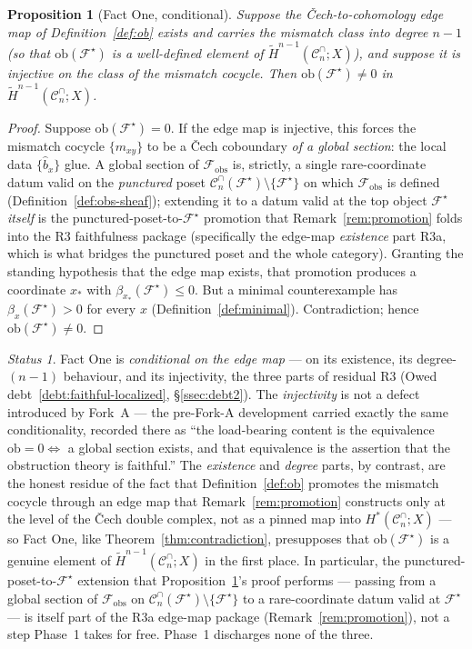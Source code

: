 \documentclass[11pt,oneside]{amsart}
\theoremstyle{plain}
\newtheorem{proposition}[theorem]{Proposition}
\theoremstyle{definition}
\theoremstyle{remark}
\theoremstyle{honeststyle}
\newtheorem{status}[theorem]{Status}
\newcommand{\F}{\mathcal{F}}
\newcommand{\Fstar}{\F^{\star}}
\newcommand{\bias}{\beta}
\newcommand{\Cn}{\mathcal{C}^{\cap}_n}
\newcommand{\ob}{\mathrm{ob}}
\newcommand{\fobs}{\mathcal{F}_{\mathrm{obs}}}
\begin{document}
\begin{proposition}[Fact One, conditional]
\label{prop:fact-one}
Suppose the \v{C}ech-to-cohomology edge map of Definition~\ref{def:ob}
exists and carries the mismatch class into degree $n-1$ (so that
$\ob(\Fstar)$ is a well-defined element of $\widetilde
H^{n-1}(\Cn;X)$), and suppose it is injective on the class of the
mismatch cocycle. Then $\ob(\Fstar)\neq0$ in $\widetilde
H^{n-1}(\Cn;X)$.
\end{proposition}

\begin{proof}
Suppose $\ob(\Fstar)=0$. If the edge map is injective, this forces the
mismatch cocycle $\{m_{xy}\}$ to be a \v{C}ech coboundary \emph{of a
global section}: the local data $\{\widehat b_x\}$ glue. A global
section of $\fobs$ is, strictly, a single rare-coordinate datum valid
on the \emph{punctured} poset $\Cn(\Fstar)\setminus\{\Fstar\}$ on
which $\fobs$ is defined (Definition~\ref{def:obs-sheaf}); extending
it to a datum valid at the top object $\Fstar$ \emph{itself} is the
punctured-poset-to-$\Fstar$ promotion that
Remark~\ref{rem:promotion} folds into the R3 faithfulness package
(specifically the edge-map \emph{existence} part R3a, which is what
bridges the punctured poset and the whole category). Granting the
standing hypothesis that the edge map exists, that promotion produces
a coordinate $x_\ast$ with $\bias_{x_\ast}(\Fstar)\le0$. But a
minimal counterexample has $\bias_x(\Fstar)>0$ for every $x$
(Definition~\ref{def:minimal}). Contradiction; hence
$\ob(\Fstar)\neq0$.
\end{proof}

\begin{status}
\label{status:fact-one}
Fact One is \emph{conditional on the edge map} --- on its existence,
its degree-$(n-1)$ behaviour, and its injectivity, the three parts of
residual R3 (Owed debt~\ref{debt:faithful-localized},
\S\ref{ssec:debt2}). The \emph{injectivity} is not a defect introduced
by Fork~A --- the pre-Fork-A development carried exactly the same
conditionality, recorded there as ``the load-bearing content is the
equivalence $\ob=0\iff$ a global section exists, and that equivalence
is the assertion that the obstruction theory is faithful.'' The
\emph{existence} and \emph{degree} parts, by contrast, are the honest
residue of the fact that Definition~\ref{def:ob} promotes the mismatch
cocycle through an edge map that Remark~\ref{rem:promotion} constructs
only at the level of the \v{C}ech double complex, not as a pinned map
into $H^{*}(\Cn;X)$ --- so Fact One, like Theorem~\ref{thm:contradiction},
presupposes that $\ob(\Fstar)$ is a genuine element of $\widetilde
H^{n-1}(\Cn;X)$ in the first place. In particular, the
punctured-poset-to-$\Fstar$ extension that
Proposition~\ref{prop:fact-one}'s proof performs --- passing from a
global section of $\fobs$ on $\Cn(\Fstar)\setminus\{\Fstar\}$ to a
rare-coordinate datum valid at $\Fstar$ --- is itself part of the R3a
edge-map package (Remark~\ref{rem:promotion}), not a step Phase~1
takes for free. Phase~1 discharges none of the three.
\end{status}
\end{document}
